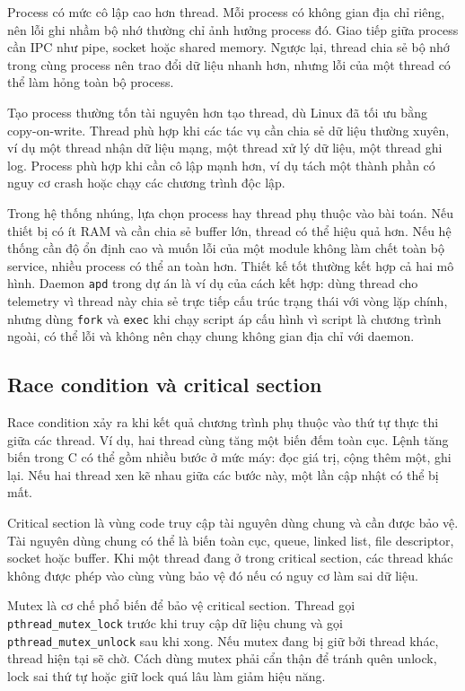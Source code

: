\documentclass[11pt]{article}
\newcommand{\code}[1]{\texttt{#1}}
\begin{document}
Process có mức cô lập cao hơn thread. Mỗi process có không gian địa chỉ riêng, nên lỗi ghi nhầm bộ nhớ thường chỉ ảnh hưởng process đó. Giao tiếp giữa process cần IPC như pipe, socket hoặc shared memory. Ngược lại, thread chia sẻ bộ nhớ trong cùng process nên trao đổi dữ liệu nhanh hơn, nhưng lỗi của một thread có thể làm hỏng toàn bộ process.

Tạo process thường tốn tài nguyên hơn tạo thread, dù Linux đã tối ưu bằng copy-on-write. Thread phù hợp khi các tác vụ cần chia sẻ dữ liệu thường xuyên, ví dụ một thread nhận dữ liệu mạng, một thread xử lý dữ liệu, một thread ghi log. Process phù hợp khi cần cô lập mạnh hơn, ví dụ tách một thành phần có nguy cơ crash hoặc chạy các chương trình độc lập.

Trong hệ thống nhúng, lựa chọn process hay thread phụ thuộc vào bài toán. Nếu thiết bị có ít RAM và cần chia sẻ buffer lớn, thread có thể hiệu quả hơn. Nếu hệ thống cần độ ổn định cao và muốn lỗi của một module không làm chết toàn bộ service, nhiều process có thể an toàn hơn. Thiết kế tốt thường kết hợp cả hai mô hình. Daemon \code{apd} trong dự án là ví dụ của cách kết hợp: dùng thread cho telemetry vì thread này chia sẻ trực tiếp cấu trúc trạng thái với vòng lặp chính, nhưng dùng \code{fork} và \code{exec} khi chạy script áp cấu hình vì script là chương trình ngoài, có thể lỗi và không nên chạy chung không gian địa chỉ với daemon.

\subsection{Race condition và critical section}

Race condition xảy ra khi kết quả chương trình phụ thuộc vào thứ tự thực thi giữa các thread. Ví dụ, hai thread cùng tăng một biến đếm toàn cục. Lệnh tăng biến trong C có thể gồm nhiều bước ở mức máy: đọc giá trị, cộng thêm một, ghi lại. Nếu hai thread xen kẽ nhau giữa các bước này, một lần cập nhật có thể bị mất.

Critical section là vùng code truy cập tài nguyên dùng chung và cần được bảo vệ. Tài nguyên dùng chung có thể là biến toàn cục, queue, linked list, file descriptor, socket hoặc buffer. Khi một thread đang ở trong critical section, các thread khác không được phép vào cùng vùng bảo vệ đó nếu có nguy cơ làm sai dữ liệu.

Mutex là cơ chế phổ biến để bảo vệ critical section. Thread gọi \code{pthread\_mutex\_lock} trước khi truy cập dữ liệu chung và gọi \code{pthread\_mutex\_unlock} sau khi xong. Nếu mutex đang bị giữ bởi thread khác, thread hiện tại sẽ chờ. Cách dùng mutex phải cẩn thận để tránh quên unlock, lock sai thứ tự hoặc giữ lock quá lâu làm giảm hiệu năng.
\end{document}
